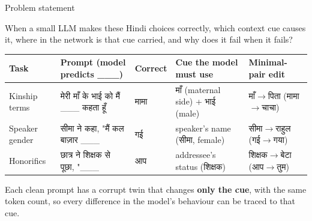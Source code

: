 \documentclass[aspectratio=169,10pt]{beamer}
\newcommand{\hi}[1]{{\devfont #1}}
\begin{document}
\begin{frame}{Problem statement}
\begin{block}{}
When a small LLM makes these Hindi choices correctly, \alert{which context cue causes it}, \alert{where in the network} is that cue carried, and \alert{why does it fail} when it fails?
\end{block}
\vspace{0.3em}
\footnotesize
\begin{tabularx}{\textwidth}{@{}l Y l Y l@{}}
\toprule
\textbf{Task} & \textbf{Prompt (model predicts \_\_\_)} & \textbf{Correct} & \textbf{Cue the model must use} & \textbf{Minimal-pair edit} \\
\midrule
Kinship terms & \hi{मेरी माँ के भाई को मैं \_\_\_ कहता हूँ} & \hi{मामा} & \hi{माँ} (maternal side) + \hi{भाई} (male) & \hi{माँ}\(\to\)\hi{पिता} \;(\hi{मामा}\(\to\)\hi{चाचा}) \\[3pt]
Speaker gender & \hi{सीमा ने कहा, "मैं कल बाज़ार \_\_\_} & \hi{गई} & speaker's name (\hi{सीमा}, female) & \hi{सीमा}\(\to\)\hi{राहुल} \;(\hi{गई}\(\to\)\hi{गया}) \\[3pt]
Honorifics & \hi{छात्र ने शिक्षक से पूछा, "\_\_\_} & \hi{आप} & addressee's status (\hi{शिक्षक}) & \hi{शिक्षक}\(\to\)\hi{बेटा} \;(\hi{आप}\(\to\)\hi{तुम}) \\
\bottomrule
\end{tabularx}

\vspace{0.6em}
\small
Each clean prompt has a corrupt twin that changes \textbf{only the cue}, with the same token count, so every difference in the model's behaviour can be traced to that cue.
\end{frame}
\end{document}
